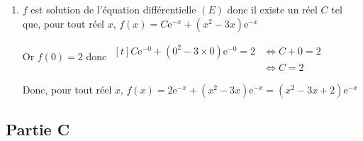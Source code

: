 \documentclass[10pt]{article}
\providecommand{\e}{{\mathrm{e}}}
\begin{document}
\begin{enumerate}
		\item $f$ est solution de l'équation différentielle $(E)$  donc il existe un réel $C$ tel que, pour tout réel $x$, $f(x) = C\e^{-x} +\left(  x^2-3x \right) \e^{-x}$

		Or $f(0)=2$ donc $\begin{aligned}[t] C\e^{-0} +\left(  0^2-3\times 0 \right) \e^{-0} = 2 &\iff C + 0=2 \\
			&\iff C=2 \end{aligned}$

		Donc, pour tout réel $x$, $f(x) = 2\e^{-x} +\left(  x^2- 3x \right) \e^{-x} = \left(x^{2}-3 x+2\right)\e^{-x}$

	\end{enumerate}

	\subsection*{Partie C}
\end{document}
